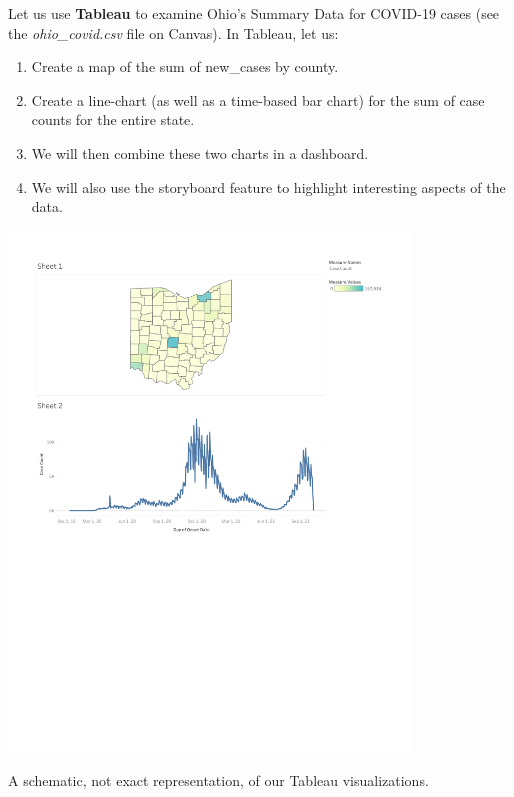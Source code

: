 \documentclass[letterpaper,addpoints, 11pt]{exam}
\begin{document}
\begin{questions}


\question[0] Let us use \textbf{Tableau} to examine Ohio's Summary Data for COVID-19 cases (see the \textit{ohio\_covid.csv} file on Canvas). In Tableau, let us:
\begin{enumerate}[label=(\Alph*)]
	\item Create a map of the sum of new\_cases by county.
	\item Create a line-chart (as well as a time-based bar chart) for the sum of case counts for the entire state.
	\item We will then combine these two charts in a dashboard.
	\item We will also use the storyboard feature to highlight interesting aspects of the data.
\end{enumerate}

\begin{center}
	\includegraphics[width=0.8\textwidth,frame, clip, trim={0.5in 4.5in 0.5in 0.5in} ]{../../figures/tableau_example.pdf} 
	
	A schematic, not exact representation, of our Tableau visualizations.
\end{center}

\newpage


\end{questions}
\end{document}
